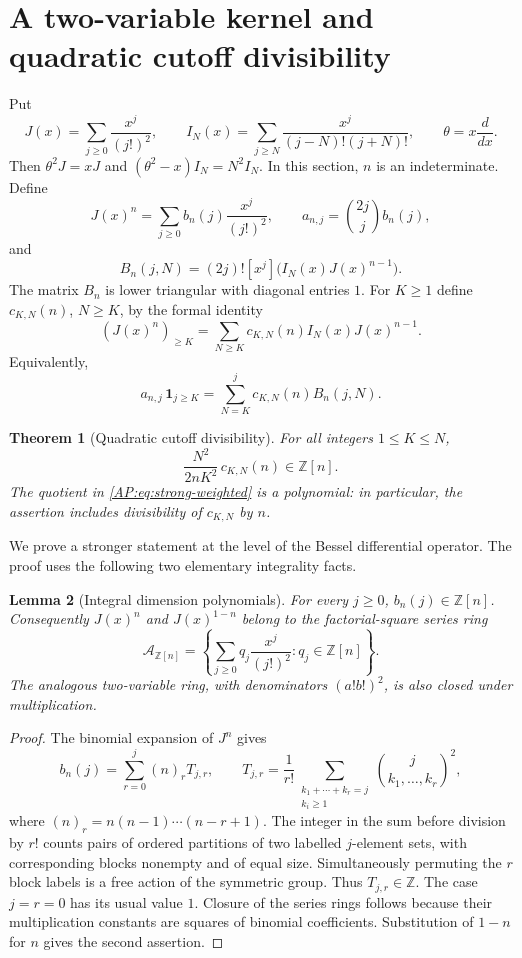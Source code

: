 \documentclass[11pt,a4paper]{article}
\newtheorem{theorem}{Theorem}[section]
\newtheorem{lemma}[theorem]{Lemma}
\theoremstyle{definition}\newtheorem{definition}[theorem]{Definition}
\theoremstyle{remark}\newtheorem{remark}[theorem]{Remark}
\numberwithin{equation}{section}
\newcommand{\ZZ}{\mathbb Z}\newcommand{\QQ}{\mathbb Q}\newcommand{\tht}{\theta}
\begin{document}
\section{A two-variable kernel and quadratic cutoff divisibility}\label{AP:source-main-4}\label{AP:sec:kernel}

Put
\[
 J(x)=\sum_{j\geq0}\frac{x^j}{(j!)^2},\qquad
 I_N(x)=\sum_{j\geq N}\frac{x^j}{(j-N)!(j+N)!},\qquad
 \tht=x\frac{d}{dx}.
\]
Then $\tht^2J=xJ$ and $(\tht^2-x)I_N=N^2I_N$.
In this section, $n$ is an indeterminate.  Define
\[
 J(x)^n=\sum_{j\geq0}b_n(j)\frac{x^j}{(j!)^2},\qquad
 a_{n,j}=\binom{2j}{j}b_n(j),
\]
and
\[
 B_n(j,N)=(2j)![x^j]\bigl(I_N(x)J(x)^{n-1}\bigr).
\]
The matrix $B_n$ is lower triangular with diagonal entries $1$.  For $K\geq1$
define $c_{K,N}(n)$, $N\geq K$, by the formal identity
\begin{equation}\label{AP:eq:tail-definition}
 (J(x)^n)_{\geq K}
   =\sum_{N\geq K}c_{K,N}(n)I_N(x)J(x)^{n-1}.
\end{equation}
Equivalently,
\[
 a_{n,j}\,\boldsymbol 1_{j\geq K}
   =\sum_{N=K}^{j}c_{K,N}(n)B_n(j,N).
\]

\begin{theorem}[Quadratic cutoff divisibility]\label{AP:thm:weighted}
For all integers $1\leq K\leq N$,
\begin{equation}\label{AP:eq:strong-weighted}
 \boxed{\displaystyle
  \frac{N^2}{2nK^2}\,c_{K,N}(n)\in\ZZ[n].}
\end{equation}
The quotient in \eqref{AP:eq:strong-weighted} is a polynomial: in particular,
the assertion includes divisibility of $c_{K,N}$ by $n$.
\end{theorem}

We prove a stronger statement at the level of the Bessel differential
operator.  The proof uses the following two elementary integrality facts.

\begin{lemma}[Integral dimension polynomials]\label{AP:lem:dimension}
For every $j\geq0$, $b_n(j)\in\ZZ[n]$.  Consequently $J(x)^n$ and
$J(x)^{1-n}$ belong to the factorial-square series ring
\[
 \mathcal A_{\ZZ[n]}=
 \left\{\sum_{j\geq0}q_j\frac{x^j}{(j!)^2}:q_j\in\ZZ[n]\right\}.
\]
The analogous two-variable ring, with denominators $(a!b!)^2$, is also closed
under multiplication.
\end{lemma}
\begin{proof}
The binomial expansion of $J^n$ gives
\[
 b_n(j)=\sum_{r=0}^{j}(n)_r T_{j,r},\qquad
 T_{j,r}=\frac1{r!}
 \sum_{\substack{k_1+\cdots+k_r=j\\k_i\geq1}}
       \binom{j}{k_1,\ldots,k_r}^{\!2},
\]
where $(n)_r=n(n-1)\cdots(n-r+1)$.  The integer in the sum before division by
$r!$ counts pairs of ordered partitions of two labelled $j$-element sets,
with corresponding blocks nonempty and of equal size.  Simultaneously
permuting the $r$ block labels is a free action of the symmetric group.
Thus $T_{j,r}\in\ZZ$.  The case $j=r=0$ has its usual value $1$.
Closure of the series rings follows because their multiplication constants
are squares of binomial coefficients.  Substitution of $1-n$ for $n$ gives
the second assertion.
\end{proof}
\end{document}
